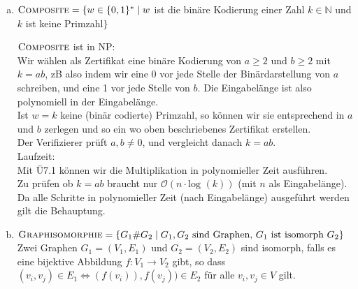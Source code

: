 \begin{enumerate}[(a)]
	\item $\textsc{Composite} = \{ w \in \{0,1\}^* \mid w $ ist die binäre Kodierung einer Zahl $k \in \mathbb{N} $ und $k$ ist keine Primzahl$ \}$
	
	$\textsc{Composite}$ ist in NP:\\
	Wir wählen als Zertifikat eine binäre Kodierung von $a \geq 2$ und $b \geq 2$ mit $k=ab$, zB also indem wir eine 0 vor jede Stelle der Binärdarstellung von $a$ schreiben, und eine 1 vor jede Stelle von $b$. Die Eingabelänge ist also polynomiell in der Eingabelänge.\\
	Ist $w=k$ keine (binär codierte) Primzahl, so können wir sie entsprechend in $a$ und $b$ zerlegen und so ein wo oben beschriebenes Zertifikat erstellen.\\
	Der Verifizierer prüft $a, b \neq 0$, und vergleicht danach $k=ab$.\\
	
	Laufzeit:\\
	Mit Ü7.1 können wir die Multiplikation in polynomieller Zeit ausführen.\\
	Zu prüfen ob $k=ab$ braucht nur $ \mathcal{O} (n \cdot \text{log }(k))$ (mit $n$ als Eingabelänge).\\
	Da alle Schritte in polynomieller Zeit (nach Eingabelänge) ausgeführt werden gilt die Behauptung.
	
	
	\item $\textsc{Graphisomorphie} = \{ G_1 \# G_2 \mid G_1, G_2 \text{ sind Graphen, }G_1 \text{ ist isomorph }G_2 \}$\\
	Zwei Graphen $G_1 = (V_1, E_1)$ und $G_2 = (V_2, E_2)$ sind isomorph, falls es eine bijektive Abbildung $f: V_1 \rightarrow V_2$ gibt, so dass $(v_i, v_j) \in E_1 \Leftrightarrow (f(v_i)), f(v_j)) \in E_2$ für alle $v_i, v_j \in V$ gilt.
	

\end{enumerate}

